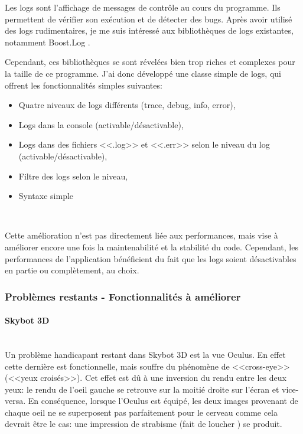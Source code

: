 \documentclass[a4paper,french,12pt]{article}
\begin{document}
	Les logs sont l'affichage de messages de contrôle au cours du programme. Ils permettent de vérifier son exécution
	et de détecter des bugs.
	Après avoir utilisé des logs rudimentaires, je me suis intéressé aux bibliothèques de logs existantes, notamment Boost.Log .

	Cependant, ces bibliothèques se sont révelées bien trop riches et complexes pour la taille de ce programme.
	J'ai donc développé une classe simple de logs, qui offrent les fonctionnalités simples suivantes:

	\begin{itemize}
	 \item Quatre niveaux de logs différents (trace, debug, info, error),
	 \item Logs dans la console (activable/désactivable),
	 \item Logs dans des fichiers <<.log>> et <<.err>> selon le niveau du log (activable/désactivable),
	 \item Filtre des logs selon le niveau,
	 \item Syntaxe simple
	\end{itemize}~

	Cette amélioration n'est pas directement liée aux performances, mais vise à améliorer encore une fois la maintenabilité
	et la stabilité du code.
	Cependant, les performances de l'application bénéficient du fait que les logs soient désactivables en partie ou complètement, au choix.

    \subsubsection{Problèmes restants - Fonctionnalités à améliorer}
      \paragraph{Skybot 3D}~\\
	\label{cross_eye}
	Un problème handicapant restant dans Skybot 3D est la vue Oculus.
	En effet cette dernière est fonctionnelle, mais souffre du phénomène de <<cross-eye>> (<<yeux croisés>>).
	Cet effet est dû à une inversion du rendu entre les deux yeux: le rendu de l'oeil gauche se retrouve sur la moitié  droite sur
	l'écran et vice-versa.
	En conséquence, lorsque l'Oculus est équipé, les deux images provenant de chaque oeil ne se superposent pas
	parfaitement pour le cerveau comme cela devrait être le cas: une impression de strabisme (fait de loucher ) se produit.
\end{document}
